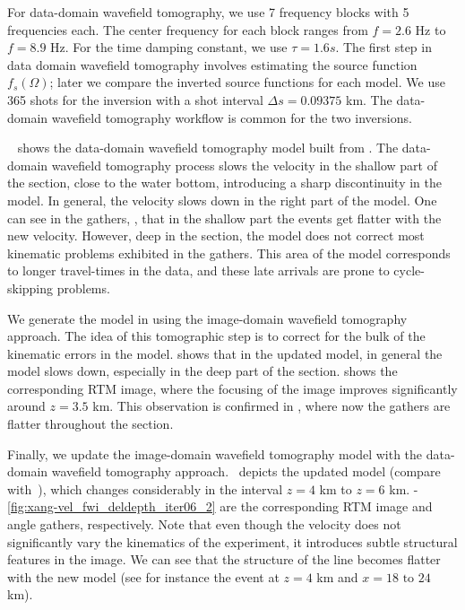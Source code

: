 For data-domain wavefield tomography, we use 7 frequency blocks with 5 frequencies each. The center frequency
for each block ranges from $f=2.6$ Hz to $f=8.9$ Hz. For the time damping constant, we use $\tau=1.6s$.
 The first step in data domain wavefield tomography involves estimating the source function $f_s(\Omega)$; later 
we compare the inverted source functions for each model.  
 We use 365 shots for the inversion 
with a shot interval $\Delta s=0.09375$ km. The data-domain wavefield tomography workflow is common for the two inversions.

~ shows the data-domain wavefield tomography model built from . The data-domain wavefield tomography process slows 
the velocity in the shallow part of the section,
close to the water bottom, introducing a sharp discontinuity in the model. In general, 
the velocity slows down in the right part of the model. One can see in the gathers, ,
 that in the shallow part the events get flatter with the new velocity. However, deep in the section,
 the model does not correct most kinematic problems exhibited in the gathers. This area of the model
corresponds to longer travel-times in the data, and these late arrivals are prone to cycle-skipping problems. 

We generate the model in  using the image-domain wavefield tomography approach.
The idea of this tomographic step is to correct for the bulk of the kinematic errors in the model. 
 shows that in the updated model, in general the model slows down, especially in the
deep part of the section.  shows the corresponding RTM image, 
where the focusing of the image improves significantly around $z=3.5$ km.
 This observation is confirmed in , where now the gathers are flatter throughout the section.

Finally, we update the image-domain wavefield tomography model with the data-domain wavefield tomography approach.~ depicts 
the updated model (compare with~), which
changes considerably in the interval $z=4$ km to $z=6$ km. 
-\ref{fig:xang-vel_fwi_deldepth_iter06_2}
are the corresponding RTM image and angle gathers, respectively. 
Note that even though the velocity does not significantly vary the kinematics of the experiment, 
it introduces subtle structural features in the image. We can see that the structure of the line
becomes flatter with the new model (see for instance the event at $z=4$ km and $x=18 \text{ to } 24$ km). 


